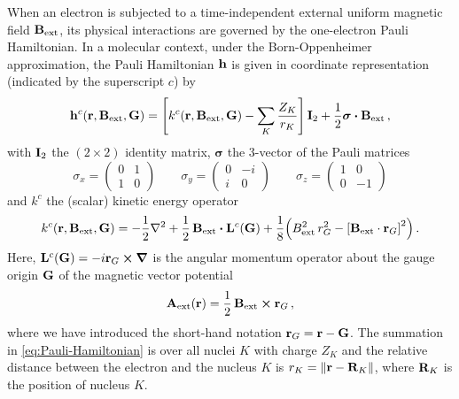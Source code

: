 \documentclass[journal=jctc,manuscript=article]{achemso}
\begin{document}
        When an electron is subjected to a time-independent external uniform magnetic field $\vb{B}_{\text{ext}}$, its physical interactions are governed by the one-electron Pauli Hamiltonian.
        In a molecular context, under the Born-Oppenheimer approximation, the Pauli Hamiltonian $\vb{h}$ is given in coordinate representation (indicated by the superscript $c$) by \cite{Bransden.2000, Helgaker.2012, Cohen-Tannoudji.2020.Volume2}
        \begin{equation} \label{eq:Pauli-Hamiltonian}
            \vb{h}^c(\vb{r}, \vb{B}_{\text{ext}}, \vb{G})
            = \qty[
                k^c(\vb{r}, \vb{B}_{\text{ext}},\vb{G})
                - \sum_K
                    \frac{Z_K}{r_K}
            ] \thinspace \vb{I}_2
            + \frac{1}{2}
                \boldsymbol{\sigma} \vdot \vb{B}_{\text{ext}}
            \thinspace ,
        \end{equation}
        with $\vb{I}_2$ the $(2 \times 2)$ identity matrix, $\boldsymbol{\sigma}$ the 3-vector of the Pauli matrices
        \begin{equation}
            \sigma_x =
            \begin{pmatrix} 0 & 1 \\ 1 & 0 \end{pmatrix}
            \qquad
            \sigma_y = \begin{pmatrix} 0 & -i \\ i & 0 \end{pmatrix}
            \qquad
            \sigma_z = \begin{pmatrix} 1 & 0 \\ 0 & -1 \end{pmatrix}
            \label{eq:pauli-matrices}
        \end{equation}
        and $k^c$ the (scalar) kinetic energy operator
        \begin{equation} \label{eq:scalar-kinetic-energy-operator}
            k^c(\vb{r}, \vb{B}_{\text{ext}},\vb{G})
            = - \frac{1}{2} \laplacian
            + \frac{1}{2} \thinspace
                \vb{B}_{\text{ext}} \vdot \vb{L}^c(\vb{G})
            + \frac{1}{8} \qty(
                B^2_{\text{ext}} \thinspace r_G^2
                - \qty[ \vb{B}_{\text{ext}} \cdot \vb{r}_G ]^2
            )
            \thinspace .
        \end{equation}
        Here, $\vb{L}^c(\vb{G}) = -i \vb{r}_G \cross \grad$ is the angular momentum operator about the gauge origin $\vb{G}$ of the magnetic vector potential
        \begin{equation} \label{eq:vector-potential}
            \vb{A}_{\text{ext}}(\vb{r})
            = \frac{1}{2} \thinspace
                \vb{B}_{\text{ext}} \cross \vb{r}_G
            \thinspace ,
        \end{equation}
        where we have introduced the short-hand notation $\vb{r}_G = \vb{r} - \vb{G}$.
        The summation in \cref{eq:Pauli-Hamiltonian} is over all nuclei $K$ with charge $Z_K$ and the relative distance between the electron and the nucleus $K$ is $r_K = \norm{\vb{r}-\vb{R}_K}$, where $\vb{R}_K$ is the position of nucleus $K$.
\end{document}
